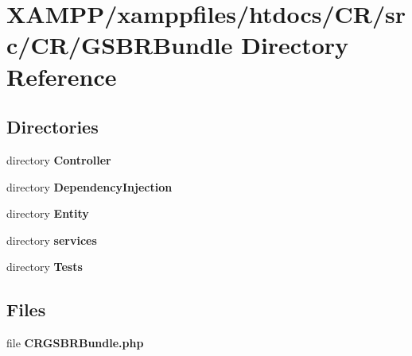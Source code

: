 \section{X\+A\+M\+P\+P/xamppfiles/htdocs/\+C\+R/src/\+C\+R/\+G\+S\+B\+R\+Bundle Directory Reference}
\label{dir_90b4fe83415ff7fd77e0427f772d6296}
\subsection*{Directories}
\begin{DoxyCompactItemize}
\item 
directory {\bf Controller}
\item 
directory {\bf Dependency\+Injection}
\item 
directory {\bf Entity}
\item 
directory {\bf services}
\item 
directory {\bf Tests}
\end{DoxyCompactItemize}
\subsection*{Files}
\begin{DoxyCompactItemize}
\item 
file {\bfseries C\+R\+G\+S\+B\+R\+Bundle.\+php}
\end{DoxyCompactItemize}
